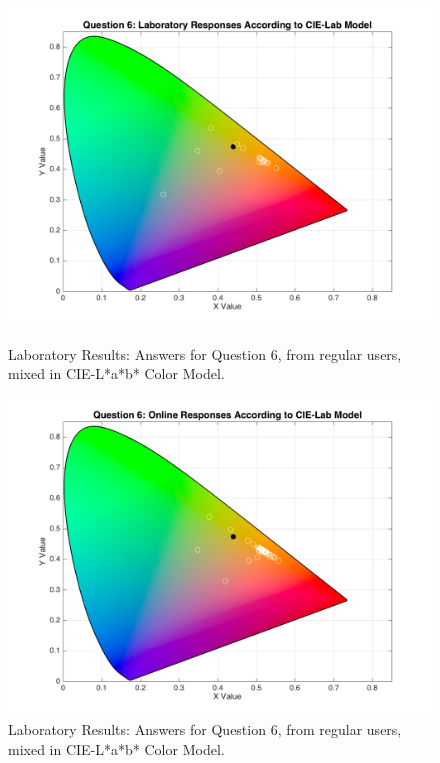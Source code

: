 \begin{figure}[!htbp]
  \centering
  \begin{minipage}{0.48\textwidth}
    \centering
    \includegraphics[width=\textwidth]{images/6_lab_Labresponses.png}
    \caption[Laboratory Results: Answers for Question 6, from regular users, mixed in CIE-L*a*b* Color Model.]{Laboratory Results: Answers for Question 6, from regular users, mixed in CIE-L*a*b* Color Model.}
    \label{fig:lablabregular_6}
  \end{minipage}\hfill
  \begin{minipage}{0.48\textwidth}
    \centering
    \includegraphics[width=\textwidth]{images/6_online_Labresponses.png}
    \caption[Online Results: Answers for Question 6, from regular users, mixed in CIE-L*a*b* Color Model.]{Laboratory Results: Answers for Question 6, from regular users, mixed in CIE-L*a*b* Color Model.}
    \label{fig:onlinelabregular_6}
  \end{minipage}
\end{figure}
